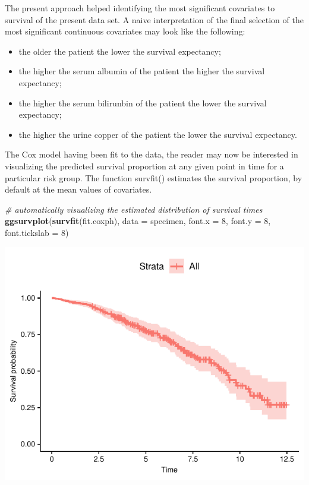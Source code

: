 \documentclass[]{article}
\newenvironment{Shaded}{\begin{snugshade}}{\end{snugshade}}
\newcommand{\KeywordTok}[1]{\textcolor[rgb]{0.13,0.29,0.53}{\textbf{#1}}}
\newcommand{\DataTypeTok}[1]{\textcolor[rgb]{0.13,0.29,0.53}{#1}}
\newcommand{\DecValTok}[1]{\textcolor[rgb]{0.00,0.00,0.81}{#1}}
\newcommand{\CommentTok}[1]{\textcolor[rgb]{0.56,0.35,0.01}{\textit{#1}}}
\newcommand{\NormalTok}[1]{#1}
\providecommand{\tightlist}{%
  \setlength{\itemsep}{0pt}\setlength{\parskip}{0pt}}
\begin{document}
The present approach helped identifying the most significant covariates
to survival of the present data set. A naive interpretation of the final
selection of the most significant continuous covariates may look like
the following:

\begin{itemize}
\tightlist
\item
  the older the patient the lower the survival expectancy;
\item
  the higher the serum albumin of the patient the higher the survival
  expectancy;
\item
  the higher the serum bilirunbin of the patient the lower the survival
  expectancy;
\item
  the higher the urine copper of the patient the lower the survival
  expectancy.
\end{itemize}

The Cox model having been fit to the data, the reader may now be
interested in visualizing the predicted survival proportion at any given
point in time for a particular risk group. The function survfit()
estimates the survival proportion, by default at the mean values of
covariates.

\begin{Shaded}
\begin{Highlighting}[]
\CommentTok{# automatically visualizing the estimated distribution of survival times}
\KeywordTok{ggsurvplot}\NormalTok{(}\KeywordTok{survfit}\NormalTok{(fit.coxph), }\DataTypeTok{data =}\NormalTok{ specimen,}
           \DataTypeTok{font.x =}  \DecValTok{8}\NormalTok{, }\DataTypeTok{font.y =} \DecValTok{8}\NormalTok{, }\DataTypeTok{font.tickslab =} \DecValTok{8}\NormalTok{)}
\end{Highlighting}
\end{Shaded}

\includegraphics{survival_pbc_files/figure-latex/unnamed-chunk-34-1.pdf}
\end{document}
